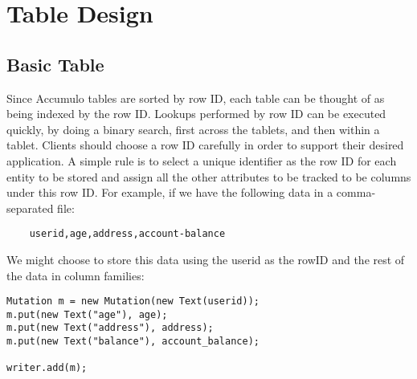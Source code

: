 
%
%

\chapter{Table Design}

\section{Basic Table}

Since Accumulo tables are sorted by row ID, each table can be thought of as being
indexed by the row ID. Lookups performed by row ID can be executed quickly, by doing
a binary search, first across the tablets, and then within a tablet. Clients should
choose a row ID carefully in order to support their desired application. A simple rule
is to select a unique identifier as the row ID for each entity to be stored and assign
all the other attributes to be tracked to be columns under this row ID. For example,
if we have the following data in a comma-separated file:

\small
\begin{verbatim}
    userid,age,address,account-balance
\end{verbatim}
\normalsize

We might choose to store this data using the userid as the rowID and the rest of the
data in column families:

\small
\begin{verbatim}
Mutation m = new Mutation(new Text(userid));
m.put(new Text("age"), age);
m.put(new Text("address"), address);
m.put(new Text("balance"), account_balance);

writer.add(m);
\end{verbatim}
\normalsize

